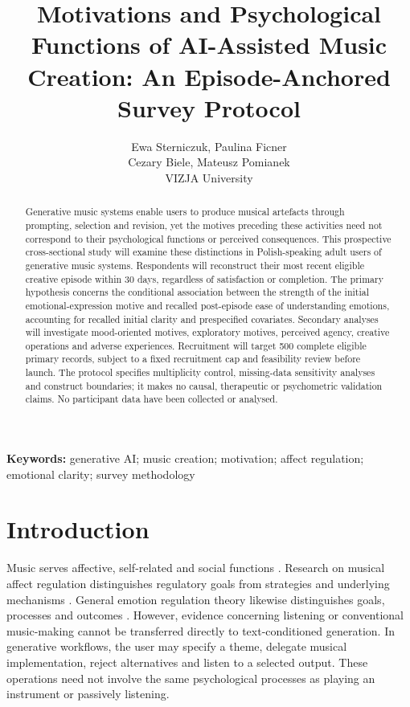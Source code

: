\documentclass[11pt,a4paper]{article}
\title{Motivations and Psychological Functions of AI-Assisted Music Creation: An Episode-Anchored Survey Protocol}
\author{Ewa Sterniczuk, Paulina Ficner\\Cezary Biele, Mateusz Pomianek\\[0.4em]\small VIZJA University}
\date{}
\begin{document}
\maketitle
\begin{abstract}
Generative music systems enable users to produce musical artefacts through prompting, selection and revision, yet the motives preceding these activities need not correspond to their psychological functions or perceived consequences. This prospective cross-sectional study will examine these distinctions in Polish-speaking adult users of generative music systems. Respondents will reconstruct their most recent eligible creative episode within 30 days, regardless of satisfaction or completion. The primary hypothesis concerns the conditional association between the strength of the initial emotional-expression motive and recalled post-episode ease of understanding emotions, accounting for recalled initial clarity and prespecified covariates. Secondary analyses will investigate mood-oriented motives, exploratory motives, perceived agency, creative operations and adverse experiences. Recruitment will target 500 complete eligible primary records, subject to a fixed recruitment cap and feasibility review before launch. The protocol specifies multiplicity control, missing-data sensitivity analyses and construct boundaries; it makes no causal, therapeutic or psychometric validation claims. No participant data have been collected or analysed.
\end{abstract}
\noindent\textbf{Keywords:} generative AI; music creation; motivation; affect regulation; emotional clarity; survey methodology

\section{Introduction}
Music serves affective, self-related and social functions \parencite{schafer2013}. Research on musical affect regulation distinguishes regulatory goals from strategies and underlying mechanisms \parencite{baltazar2016,baltazar2019}. General emotion regulation theory likewise distinguishes goals, processes and outcomes \parencite{gross2015}. However, evidence concerning listening or conventional music-making cannot be transferred directly to text-conditioned generation. In generative workflows, the user may specify a theme, delegate musical implementation, reject alternatives and listen to a selected output. These operations need not involve the same psychological processes as playing an instrument or passively listening.
\end{document}
